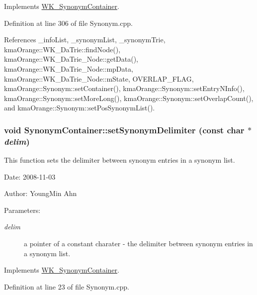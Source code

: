 Implements \hyperlink{classWK__SynonymContainer_cc44acd798ac38cb00ed4f6caeb6f2fe}{WK\_\-SynonymContainer}.

Definition at line 306 of file Synonym.cpp.

References \_\-infoList, \_\-synonymList, \_\-synonymTrie, kmaOrange::WK\_\-DaTrie::findNode(), kmaOrange::WK\_\-DaTrie\_\-Node::getData(), kmaOrange::WK\_\-DaTrie\_\-Node::mpData, kmaOrange::WK\_\-DaTrie\_\-Node::mState, OVERLAP\_\-FLAG, kmaOrange::Synonym::setContainer(), kmaOrange::Synonym::setEntryNInfo(), kmaOrange::Synonym::setMoreLong(), kmaOrange::Synonym::setOverlapCount(), and kmaOrange::Synonym::setPosSynonymList().\hypertarget{classkmaOrange_1_1SynonymContainer_01bb87b5ceba481163ea282a459694f5}{
\subsubsection[{setSynonymDelimiter}]{\setlength{\rightskip}{0pt plus 5cm}void SynonymContainer::setSynonymDelimiter (const char $\ast$ {\em delim})}}
\label{classkmaOrange_1_1SynonymContainer_01bb87b5ceba481163ea282a459694f5}


This function sets the delimiter between synonym entries in a synonym list. 

\begin{Desc}
\item[Date:]2008-11-03 \end{Desc}
\begin{Desc}
\item[Author:]YoungMin Ahn \end{Desc}
\begin{Desc}
\item[Parameters:]
\begin{description}
\item[{\em delim}]a pointer of a constant charater - the delimiter between synonym entries in a synonym list. \end{description}
\end{Desc}


Implements \hyperlink{classWK__SynonymContainer_7a2c0a7a7da0d37c1be8816b1c20c680}{WK\_\-SynonymContainer}.

Definition at line 23 of file Synonym.cpp.

